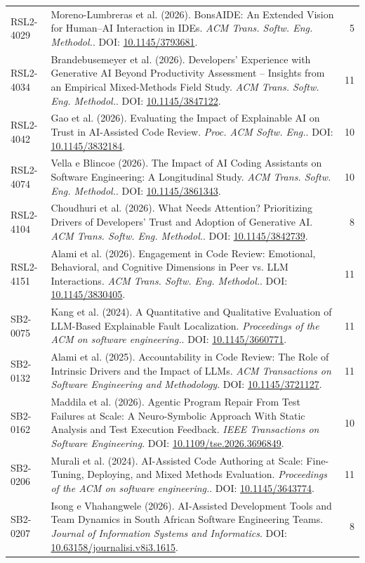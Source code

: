 \begin{small}
\begin{longtable}{lp{11.2cm}r}
RSL2-4029 & Moreno-Lumbreras et al. (2026). BonsAIDE: An Extended Vision for Human–AI Interaction in IDEs. \textit{ACM Trans. Softw. Eng. Methodol.}. DOI: \url{10.1145/3793681}. & 5 \\
RSL2-4034 & Brandebusemeyer et al. (2026). Developers’ Experience with Generative AI Beyond Productivity Assessment – Insights from an Empirical Mixed-Methods Field Study. \textit{ACM Trans. Softw. Eng. Methodol.}. DOI: \url{10.1145/3847122}. & 11 \\
RSL2-4042 & Gao et al. (2026). Evaluating the Impact of Explainable AI on Trust in AI-Assisted Code Review. \textit{Proc. ACM Softw. Eng.}. DOI: \url{10.1145/3832184}. & 10 \\
RSL2-4074 & Vella e Blincoe (2026). The Impact of AI Coding Assistants on Software Engineering: A Longitudinal Study. \textit{ACM Trans. Softw. Eng. Methodol.}. DOI: \url{10.1145/3861343}. & 10 \\
RSL2-4104 & Choudhuri et al. (2026). What Needs Attention? Prioritizing Drivers of Developers’ Trust and Adoption of Generative AI. \textit{ACM Trans. Softw. Eng. Methodol.}. DOI: \url{10.1145/3842739}. & 8 \\
RSL2-4151 & Alami et al. (2026). Engagement in Code Review: Emotional, Behavioral, and Cognitive Dimensions in Peer vs. LLM Interactions. \textit{ACM Trans. Softw. Eng. Methodol.}. DOI: \url{10.1145/3830405}. & 11 \\
SB2-0075 & Kang et al. (2024). A Quantitative and Qualitative Evaluation of LLM-Based Explainable Fault Localization. \textit{Proceedings of the ACM on software engineering.}. DOI: \url{10.1145/3660771}. & 11 \\
SB2-0132 & Alami et al. (2025). Accountability in Code Review: The Role of Intrinsic Drivers and the Impact of LLMs. \textit{ACM Transactions on Software Engineering and Methodology}. DOI: \url{10.1145/3721127}. & 11 \\
SB2-0162 & Maddila et al. (2026). Agentic Program Repair From Test Failures at Scale: A Neuro-Symbolic Approach With Static Analysis and Test Execution Feedback. \textit{IEEE Transactions on Software Engineering}. DOI: \url{10.1109/tse.2026.3696849}. & 10 \\
SB2-0206 & Murali et al. (2024). AI-Assisted Code Authoring at Scale: Fine-Tuning, Deploying, and Mixed Methods Evaluation. \textit{Proceedings of the ACM on software engineering.}. DOI: \url{10.1145/3643774}. & 11 \\
SB2-0207 & Isong e Vhahangwele (2026). AI-Assisted Development Tools and Team Dynamics in South African Software Engineering Teams. \textit{Journal of Information Systems and Informatics}. DOI: \url{10.63158/journalisi.v8i3.1615}. & 8 \\

\end{longtable}
\end{small}
